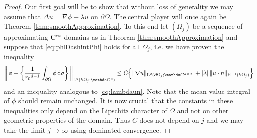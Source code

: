 \begin{proof}
  Our first goal will be to show that without loss of generality we may assume that $\Delta u = \nabla \phi + \lambda u$ on $\partial\Omega$.
  The central player will once again be Theorem \ref{thm:smoothApproximation}.
  To this end let $(\Omega_j)$ be a sequence of approximating $\mathrm{C}^\infty$ domains as in Theorem \ref{thm:smoothApproximation} and suppose that
  \ref{eq:phiDashintPhi} holds for all $\Omega_j$, i.e. we have proven the inequality
  \begin{align}
    \label{eq:phiDashintPhij}
    \bigg\|\, \phi - \bigg\{ \frac{1}{{r_0}^{d - 1}}\int_{\partial\Omega} \phi \d\sigma \bigg\} \, \bigg\|_{\Ell^2(\partial\Omega_j; \C^d)}
     \leq C \Big\{ \|\nabla u\|_{\Ell^2(\partial\Omega_j; \C^{d\times d})} + |\lambda| \, \|u\cdot n\|_{\HH^{-1}(\partial\Omega_j)} \Big\}
  \end{align}
  and an inequality analogous to \eqref{eq:lambdaun}.
  Note that the mean value integral of $\phi$ should remain unchanged.
  It is now crucial that the constants in these inequalities only depend on the Lipschitz character of $\Omega$ and not on other geometric properties of the domain.
  Thus $C$ does not depend on $j$ and we may take the limit $j \to \infty$ using dominated convergence.


\end{proof}
